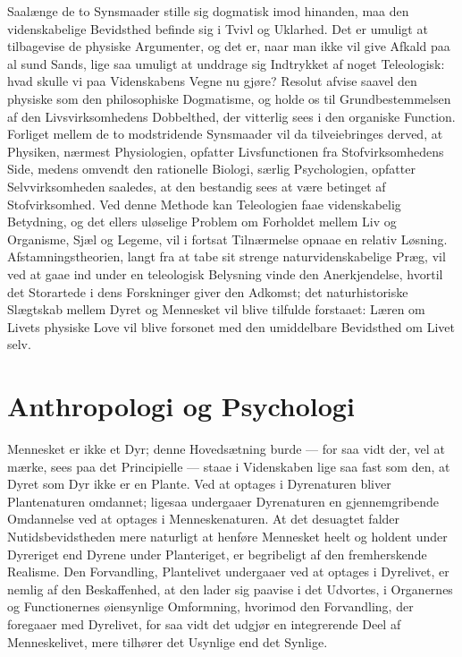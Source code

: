 \documentclass[12pt]{book}
\newcommand{\apage}[1]{\marginnote{\footnotesize\textit{[#1]}}}
\begin{document}
Saalænge de to Synsmaader stille sig dogmatisk imod hinanden, maa den
videnskabelige Bevidsthed befinde sig i Tvivl og Uklarhed. Det er umuligt
at tilbagevise de physiske Argumenter, og det er, naar man ikke vil give
Afkald paa al sund Sands, lige saa umuligt at unddrage sig Indtrykket af
noget Teleologisk: hvad skulle vi paa Videnskabens Vegne nu gjøre? Resolut
afvise saavel den physiske som den philosophiske Dogmatisme, og holde os
til Grundbestemmelsen af den Livsvirksomhedens Dobbelthed, der vitterlig
sees i den organiske Function. Forliget mellem de to modstridende
Synsmaader vil da tilveiebringes derved, at Physiken, nærmest Physiologien,
opfatter Livsfunctionen fra Stofvirksomhedens Side, medens omvendt den
rationelle Biologi, særlig Psychologien, opfatter Selvvirksomheden saaledes,
at den bestandig sees at være betinget af Stofvirksomhed. Ved denne Methode
kan Teleologien faae videnskabelig Betydning, og det ellers uløselige
Problem om Forholdet mellem Liv og Organisme, Sjæl og Legeme, vil i fortsat
Tilnærmelse \apage{205} opnaae en relativ Løsning. Afstamningstheorien, langt fra at
tabe sit strenge naturvidenskabelige Præg, vil ved at gaae ind under en
teleologisk Belysning vinde den Anerkjendelse, hvortil det Storartede i
dens Forskninger giver den Adkomst; det naturhistoriske Slægtskab mellem
Dyret og Mennesket vil blive tilfulde forstaaet: Læren om Livets physiske
Love vil blive forsonet med den umiddelbare Bevidsthed om Livet selv.

\section{Anthropologi og Psychologi}
\label{sec:20}

\noindent Mennesket er ikke et Dyr; denne Hovedsætning burde --- for saa
vidt der, vel at mærke, sees paa det Principielle --- staae i Videnskaben
lige saa fast som den, at Dyret som Dyr ikke er en Plante. Ved at optages i
Dyrenaturen bliver Plantenaturen omdannet; ligesaa undergaaer Dyrenaturen
en gjennemgribende Omdannelse ved at optages i Menneskenaturen. At det
desuagtet falder Nutidsbevidstheden mere naturligt at henføre Mennesket
heelt og holdent under Dyreriget end Dyrene under Planteriget, er begribeligt
af den fremherskende Realisme. Den Forvandling, Plantelivet undergaaer ved
at optages i Dyrelivet, er nemlig af den Beskaffenhed, at den lader sig
paavise i det Udvortes, i Organernes og Functionernes øiensynlige
Omformning, hvorimod den Forvandling, der foregaaer med Dyrelivet, for saa
vidt det udgjør en integrerende Deel af Menneskelivet, mere tilhører det
Usynlige end det Synlige.
\end{document}
